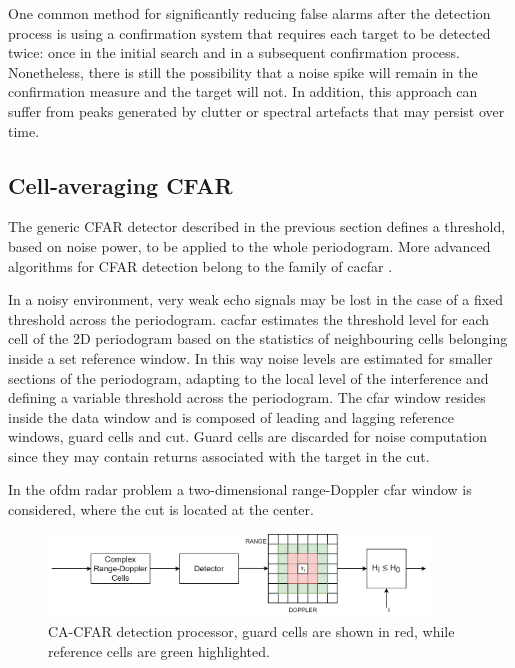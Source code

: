 			
			One common method for significantly reducing false alarms after the detection process is using a confirmation system that requires each target to be detected twice: once in the initial search and in a subsequent confirmation process.
			Nonetheless, there is still the possibility that a noise spike will remain in the confirmation measure and the target will not. In addition, this approach can suffer from peaks generated by clutter or spectral artefacts that may persist over time.

		\subsection{Cell-averaging CFAR}
		\label{sec:cell averaging CFAR}

The generic CFAR detector described in the previous section defines a threshold, based on noise power, to be applied to the whole periodogram. More advanced algorithms for CFAR detection belong to the family of \gls{cacfar} \cite{Richards_2014}.

In a noisy environment, very weak echo signals may be lost in the case of a fixed threshold across the periodogram. \gls{cacfar} estimates the threshold level for each cell of the 2D periodogram based on the statistics of neighbouring cells belonging inside a set reference window. In this way noise levels are estimated for smaller sections of the periodogram, adapting to the local level of the interference and defining a variable threshold across the periodogram.
The \gls{cfar} window resides inside the data window and is composed of leading and lagging reference windows, guard cells and \gls{cut}. Guard cells are discarded for noise computation since they may contain returns associated with the target in the \gls{cut}.

In the \gls{ofdm} radar problem a two-dimensional range-Doppler \gls{cfar} window is considered, where the \gls{cut} is located at the center.

\begin{figure}[H]
	\centering
	\includegraphics[width=0.9\textwidth]{Images/radar_detect_threshold/cacfar_pipeline.png}
	\caption{\small CA-CFAR detection processor, guard cells are shown in red, while reference cells are green highlighted.}
	\label{fig:cacfar_pipeline}
\end{figure}


